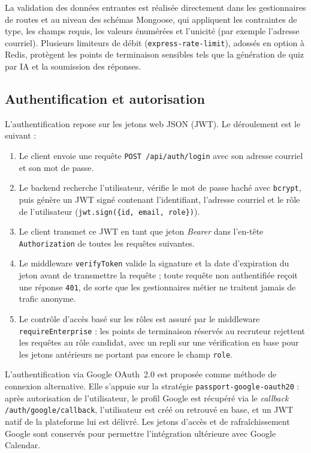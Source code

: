 La validation des données entrantes est réalisée directement dans les gestionnaires de routes
et au niveau des schémas Mongoose, qui appliquent les contraintes de type, les champs requis,
les valeurs énumérées et l'unicité (par exemple l'adresse courriel). Plusieurs limiteurs de
débit (\texttt{express-rate-limit}), adossés en option à Redis, protègent les points de
terminaison sensibles tels que la génération de quiz par IA et la soumission des réponses.

\subsection{Authentification et autorisation}

L'authentification repose sur les jetons web JSON (JWT). Le déroulement est le suivant :

\begin{enumerate}
  \item Le client envoie une requête \texttt{POST /api/auth/login} avec son adresse courriel
        et son mot de passe.
  \item Le backend recherche l'utilisateur, vérifie le mot de passe haché avec
        \texttt{bcrypt}, puis génère un JWT signé contenant l'identifiant, l'adresse courriel
        et le rôle de l'utilisateur (\texttt{jwt.sign(\allowbreak\{id, email, role\}\allowbreak)}).
  \item Le client transmet ce JWT en tant que jeton \textit{Bearer} dans l'en-tête
        \texttt{Authorization} de toutes les requêtes suivantes.
  \item Le middleware \texttt{verifyToken} valide la signature et la date d'expiration du
        jeton avant de transmettre la requête ; toute requête non authentifiée reçoit une
        réponse \texttt{401}, de sorte que les gestionnaires métier ne traitent jamais de
        trafic anonyme.
  \item Le contrôle d'accès basé sur les rôles est assuré par le middleware
        \texttt{requireEnterprise} : les points de terminaison réservés au recruteur rejettent
        les requêtes au rôle candidat, avec un repli sur une vérification en base pour les
        jetons antérieurs ne portant pas encore le champ \texttt{role}.
\end{enumerate}

L'authentification via Google OAuth~2.0 est proposée comme méthode de connexion alternative.
Elle s'appuie sur la stratégie \texttt{passport-google-oauth20} : après autorisation de
l'utilisateur, le profil Google est récupéré via le \textit{callback}
\texttt{/auth/google/callback}, l'utilisateur est créé ou retrouvé en base, et un JWT
natif de la plateforme lui est délivré. Les jetons d'accès et de rafraîchissement Google sont
conservés pour permettre l'intégration ultérieure avec Google Calendar.

